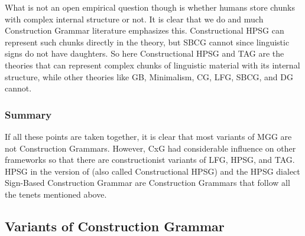 \documentclass[output=paper]{langsci/langscibook}
\begin{document}
What is not an open empirical question though is whether humans store chunks with complex internal
structure or not. It is clear that we do and much Construction Grammar literature emphasizes
this. Constructional HPSG can represent such chunks directly in the theory, but SBCG cannot since
linguistic signs do not have daughters. So here Constructional HPSG and TAG are the theories that
can represent complex chunks of linguistic material with its internal structure, while other
theories like GB, Minimalism, CG, LFG, SBCG, and DG cannot.

\subsubsection{Summary}

If all these points are taken together, it is clear that most variants of MGG are not Construction
Grammars. However, CxG had considerable influence on other frameworks so that there are
constructionist variants of LFG, HPSG, and TAG. HPSG in the version of \citet{Sag97a} (also called
Constructional HPSG) and the HPSG dialect Sign-Based Construction Grammar are Construction Grammars
that follow all the tenets mentioned above.


\subsection{Variants of Construction Grammar}
\end{document}
